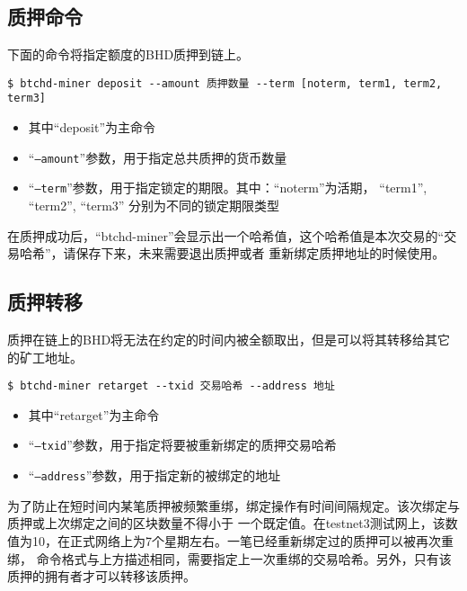 \begin{flushleft}
\subsection{质押命令}
\begin{flushleft}
    下面的命令将指定额度的BHD质押到链上。
\end{flushleft}
\scriptsize
\begin{verbatim}
$ btchd-miner deposit --amount 质押数量 --term [noterm, term1, term2, term3]
\end{verbatim}
\normalsize
\begin{itemize}
    \item 其中``deposit''为主命令
    \item ``\texttt{--amount}''参数，用于指定总共质押的货币数量
    \item ``\texttt{--term}''参数，用于指定锁定的期限。其中：``noterm''为活期， ``term1'', ``term2'', ``term3''
        分别为不同的锁定期限类型
\end{itemize}
\begin{flushleft}
    在质押成功后，``btchd-miner''会显示出一个哈希值，这个哈希值是本次交易的``交易哈希''，请保存下来，未来需要退出质押或者
    重新绑定质押地址的时候使用。
\end{flushleft}
\subsection{质押转移}
\begin{flushleft}
    质押在链上的BHD将无法在约定的时间内被全额取出，但是可以将其转移给其它的矿工地址。
\end{flushleft}
\scriptsize
\begin{verbatim}
$ btchd-miner retarget --txid 交易哈希 --address 地址
\end{verbatim}
\normalsize
\begin{itemize}
    \item 其中``retarget''为主命令
    \item ``\texttt{--txid}''参数，用于指定将要被重新绑定的质押交易哈希
    \item ``\texttt{--address}''参数，用于指定新的被绑定的地址
\end{itemize}
\begin{flushleft}
    为了防止在短时间内某笔质押被频繁重绑，绑定操作有时间间隔规定。该次绑定与质押或上次绑定之间的区块数量不得小于
    一个既定值。在testnet3测试网上，该数值为10，在正式网络上为7个星期左右。一笔已经重新绑定过的质押可以被再次重绑，
    命令格式与上方描述相同，需要指定上一次重绑的交易哈希。另外，只有该质押的拥有者才可以转移该质押。
\end{flushleft}

\end{flushleft}
